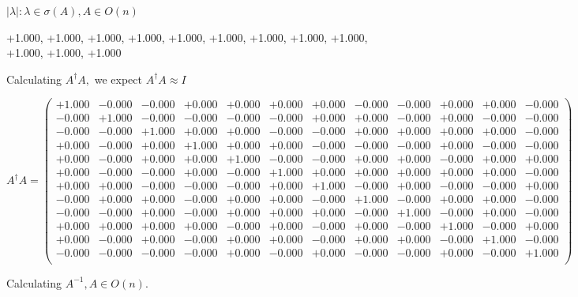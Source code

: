 \documentclass[9pt]{article}
\theoremstyle{plain}
\theoremstyle{definition}
\theoremstyle{remark}
\numberwithin{equation}{section}
\begin{document}
 $|\lambda | : \lambda \in \sigma(A) , A \in O(n)$

+1.000, +1.000, +1.000, +1.000, +1.000, +1.000, +1.000, +1.000, +1.000, +1.000, +1.000, +1.000


Calculating $A^{\dag} A,$  we expect $A^{\dag} A \approx I$

$A^{\dag} A = \left(
\begin{array}{
cccccccccccc}
+1.000 & -0.000 & -0.000 & +0.000 & +0.000 & +0.000 & +0.000 & -0.000 & -0.000 & +0.000 & +0.000 & -0.000 \\
-0.000 & +1.000 & -0.000 & -0.000 & -0.000 & -0.000 & +0.000 & +0.000 & -0.000 & +0.000 & -0.000 & -0.000 \\
-0.000 & -0.000 & +1.000 & +0.000 & +0.000 & -0.000 & -0.000 & +0.000 & +0.000 & +0.000 & +0.000 & -0.000 \\
+0.000 & -0.000 & +0.000 & +1.000 & +0.000 & +0.000 & -0.000 & -0.000 & -0.000 & +0.000 & -0.000 & -0.000 \\
+0.000 & -0.000 & +0.000 & +0.000 & +1.000 & -0.000 & -0.000 & +0.000 & +0.000 & -0.000 & +0.000 & +0.000 \\
+0.000 & -0.000 & -0.000 & +0.000 & -0.000 & +1.000 & +0.000 & +0.000 & +0.000 & +0.000 & +0.000 & -0.000 \\
+0.000 & +0.000 & -0.000 & -0.000 & -0.000 & +0.000 & +1.000 & -0.000 & +0.000 & -0.000 & -0.000 & +0.000 \\
-0.000 & +0.000 & +0.000 & -0.000 & +0.000 & +0.000 & -0.000 & +1.000 & -0.000 & +0.000 & +0.000 & -0.000 \\
-0.000 & -0.000 & +0.000 & -0.000 & +0.000 & +0.000 & +0.000 & -0.000 & +1.000 & -0.000 & +0.000 & -0.000 \\
+0.000 & +0.000 & +0.000 & +0.000 & -0.000 & +0.000 & -0.000 & +0.000 & -0.000 & +1.000 & -0.000 & +0.000 \\
+0.000 & -0.000 & +0.000 & -0.000 & +0.000 & +0.000 & -0.000 & +0.000 & +0.000 & -0.000 & +1.000 & -0.000 \\
-0.000 & -0.000 & -0.000 & -0.000 & +0.000 & -0.000 & +0.000 & -0.000 & -0.000 & +0.000 & -0.000 & +1.000 \\
\end{array}
\right)$ \newline 

Calculating $A^{-1} ,  A \in O(n)$.
\end{document}
